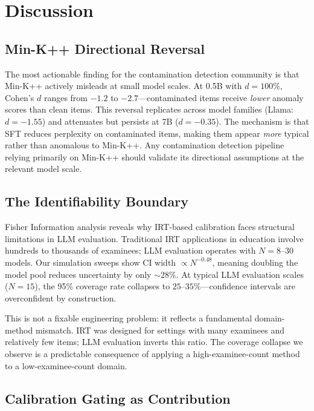 \documentclass[11pt,a4paper]{article}
\begin{document}
\section{Discussion}
\label{sec:discussion}

\subsection{Min-K++ Directional Reversal}

The most actionable finding for the contamination detection community is that Min-K++ actively misleads at small model scales.
At 0.5B with $d = 100\%$, Cohen's $d$ ranges from $-1.2$ to $-2.7$---contaminated items receive \emph{lower} anomaly scores than clean items.
This reversal replicates across model families (Llama: $d = -1.55$) and attenuates but persists at 7B ($d = -0.35$).
The mechanism is that SFT reduces perplexity on contaminated items, making them appear \emph{more} typical rather than anomalous to Min-K++.
Any contamination detection pipeline relying primarily on Min-K++ should validate its directional assumptions at the relevant model scale.

\subsection{The Identifiability Boundary}

Fisher Information analysis reveals why IRT-based calibration faces structural limitations in LLM evaluation.
Traditional IRT applications in education involve hundreds to thousands of examinees; LLM evaluation operates with $N = 8$--$30$ models.
Our simulation sweeps show CI width $\propto N^{-0.48}$, meaning doubling the model pool reduces uncertainty by only $\sim 28\%$.
At typical LLM evaluation scales ($N = 15$), the 95\% coverage rate collapses to $25$--$35\%$---confidence intervals are overconfident by construction.

This is not a fixable engineering problem: it reflects a fundamental domain-method mismatch.
IRT was designed for settings with many examinees and relatively few items; LLM evaluation inverts this ratio.
The coverage collapse we observe is a predictable consequence of applying a high-examinee-count method to a low-examinee-count domain.

\subsection{Calibration Gating as Contribution}
\end{document}
